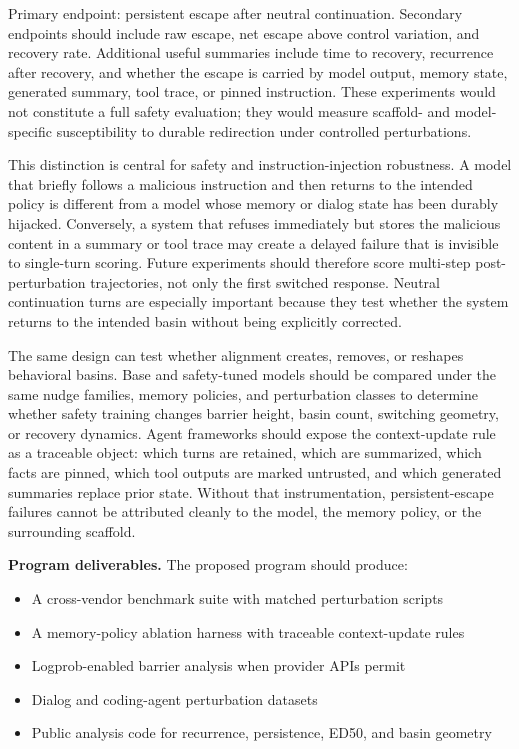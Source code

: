 \documentclass{article}
\theoremstyle{plain}
\theoremstyle{definition}
\begin{document}
Primary endpoint: persistent escape after neutral continuation. Secondary endpoints should include raw escape, net escape above control variation, and recovery rate. Additional useful summaries include time to recovery, recurrence after recovery, and whether the escape is carried by model output, memory state, generated summary, tool trace, or pinned instruction. These experiments would not constitute a full safety evaluation; they would measure scaffold- and model-specific susceptibility to durable redirection under controlled perturbations.

This distinction is central for safety and instruction-injection robustness. A model that briefly follows a malicious instruction and then returns to the intended policy is different from a model whose memory or dialog state has been durably hijacked. Conversely, a system that refuses immediately but stores the malicious content in a summary or tool trace may create a delayed failure that is invisible to single-turn scoring. Future experiments should therefore score multi-step post-perturbation trajectories, not only the first switched response. Neutral continuation turns are especially important because they test whether the system returns to the intended basin without being explicitly corrected.

The same design can test whether alignment creates, removes, or reshapes behavioral basins. Base and safety-tuned models should be compared under the same nudge families, memory policies, and perturbation classes to determine whether safety training changes barrier height, basin count, switching geometry, or recovery dynamics. Agent frameworks should expose the context-update rule as a traceable object: which turns are retained, which are summarized, which facts are pinned, which tool outputs are marked untrusted, and which generated summaries replace prior state. Without that instrumentation, persistent-escape failures cannot be attributed cleanly to the model, the memory policy, or the surrounding scaffold.

\textbf{Program deliverables.} The proposed program should produce:

\begin{itemize}
  \item A cross-vendor benchmark suite with matched perturbation scripts
  \item A memory-policy ablation harness with traceable context-update rules
  \item Logprob-enabled barrier analysis when provider APIs permit
  \item Dialog and coding-agent perturbation datasets
  \item Public analysis code for recurrence, persistence, ED50, and basin geometry
\end{itemize}
\end{document}

